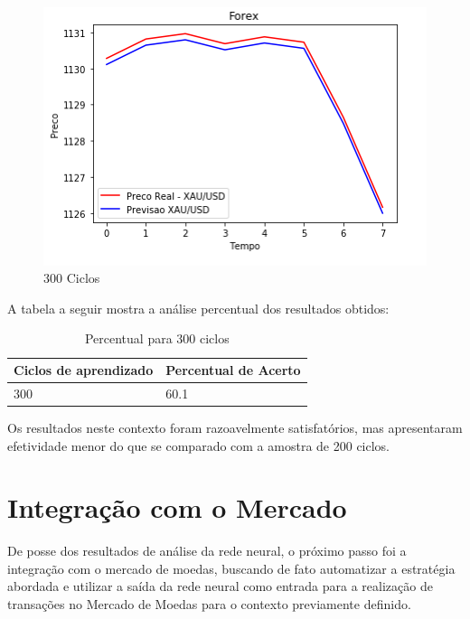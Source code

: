 \begin{figure}[h]
	\centering
	\includegraphics[keepaspectratio=true,scale=0.8]{figuras/300low.png}
	\caption{300 Ciclos}
	\label{fig18}
\end{figure}

\pagebreak

A tabela a seguir mostra a análise percentual dos resultados obtidos:

\begin{table}[h]
	\centering
	\caption{Percentual para 300 ciclos}
	\label{tab10}
  \begin{center}
      \begin{tabular}{ | l | p{5cm}}
      \hline
      Ciclos de aprendizado & Percentual de Acerto \\ \hline
		  300 & 60.1 \\ \hline
      \end{tabular}
  \end{center}
\end{table}

Os resultados neste contexto foram razoavelmente satisfatórios, mas apresentaram efetividade menor do que se comparado com a amostra de 200 ciclos.

\pagebreak

\section[Integração com o Mercado]{Integração com o Mercado}

De posse dos resultados de análise da rede neural, o próximo passo foi a integração com o mercado de moedas, buscando de fato automatizar a estratégia abordada e utilizar a saída da rede neural como entrada para a realização de transações no Mercado de Moedas para o contexto previamente definido.

